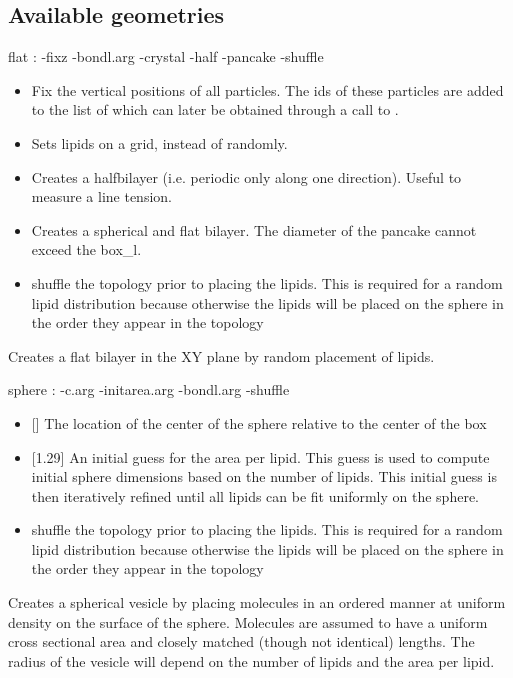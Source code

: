 \subsection{Available geometries}

\begin{code}
  flat  :  -fixz -bondl.arg -crystal -half -pancake -shuffle
\end{code}
\begin{itemize}
\item {} Fix the vertical positions of all particles. The ids
  of these particles are added to the list of 
  which can later be obtained through a call to
  .
\item {} Sets lipids on a grid, instead of randomly.
\item {} Creates a halfbilayer (i.e. periodic only along one
  direction). Useful to measure a line tension.
\item {} Creates a spherical and flat bilayer. The diameter
  of the pancake cannot exceed the box\_l.
\item {} shuffle the topology prior to placing the
  lipids. This is required for a random lipid distribution because
  otherwise the lipids will be placed on the sphere in the order they
  appear in the topology
\end{itemize}
Creates a flat bilayer in the XY plane by random placement of lipids.


\begin{code}
  sphere : -c.arg -initarea.arg -bondl.arg -shuffle
\end{code}
\begin{itemize}
\item {} [] The location of the center
  of the sphere relative to the center of the box
\item {} [1.29] An initial guess for the area per
  lipid. This guess is used to compute initial sphere dimensions based
  on the number of lipids. This initial guess is then iteratively
  refined until all lipids can be fit uniformly on the sphere.
\item {} shuffle the topology prior to placing the
  lipids. This is required for a random lipid distribution because
  otherwise the lipids will be placed on the sphere in the order they
  appear in the topology
\end{itemize}
Creates a spherical vesicle by placing molecules in an ordered manner
at uniform density on the surface of the sphere. Molecules are assumed
to have a uniform cross sectional area and closely matched (though not
identical) lengths. The radius of the vesicle will depend on the
number of lipids and the area per lipid.


